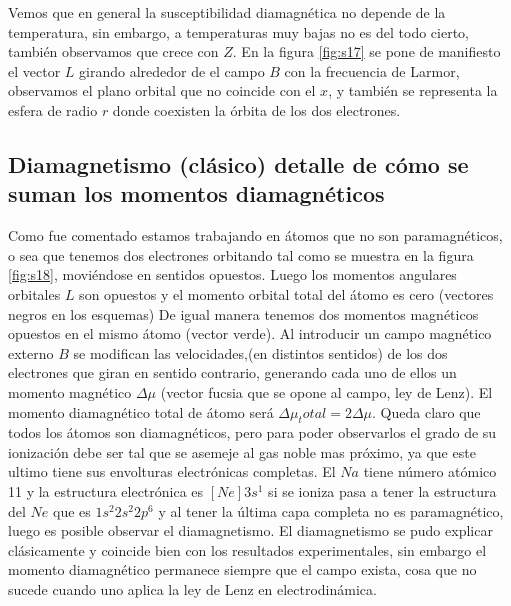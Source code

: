 Vemos que en general la susceptibilidad diamagnética no depende de la temperatura, sin embargo, a temperaturas muy bajas no es del todo cierto, también observamos que crece con $Z$. En la figura \ref{fig:s17} se pone de manifiesto el vector $L$ girando alrededor de el campo $B$ con la frecuencia de Larmor, observamos el plano orbital que no coincide con el $x$, y también se representa la esfera de radio $r$ donde coexisten la órbita de los dos electrones.

\subsection{Diamagnetismo (clásico) detalle de cómo se suman los momentos diamagnéticos}

Como fue comentado estamos trabajando en átomos que no son paramagnéticos, o sea que tenemos dos electrones orbitando tal como se muestra en la figura \ref{fig:s18}, moviéndose en sentidos opuestos. Luego los momentos angulares orbitales $L$ son opuestos y el momento orbital total del átomo es cero (vectores negros en los esquemas) De igual manera tenemos dos momentos magnéticos opuestos en el mismo átomo (vector verde). Al introducir un campo magnético externo $B$ se modifican las velocidades,(en distintos sentidos) de los dos electrones que giran en sentido contrario, generando cada uno de ellos un momento magnético $\Delta\mu$ (vector fucsia que se opone al campo, ley de Lenz). El momento diamagnético total de
átomo será $\Delta\mu_total = 2\Delta\mu$. Queda claro que todos los átomos son diamagnéticos, pero para poder observarlos el grado de su ionización debe ser tal que se asemeje al gas noble mas próximo, ya que este ultimo tiene sus envolturas electrónicas completas. El $Na$ tiene número atómico 11 y la estructura electrónica es $[Ne]3s^{1}$ si se ioniza pasa a tener la estructura del $Ne$ que es $1s^{2}2s^{2}2p^{6}$ y al tener la última capa completa no es paramagnético, luego es posible
observar el diamagnetismo. El diamagnetismo se pudo explicar clásicamente y coincide bien con los resultados experimentales, sin embargo el momento diamagnético permanece siempre que el campo exista, cosa que no sucede cuando uno aplica la ley de Lenz en electrodinámica.


